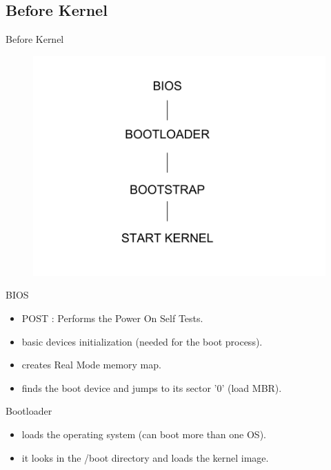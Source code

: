 \documentclass{workshop}
\begin{document}
\subsection{Before Kernel}
\begin{frame}{Before Kernel}
      \begin{figure}
         \includegraphics[scale=0.3]{img/boot.png}
      \end{figure}
\end{frame}

\begin{frame}{BIOS}
\begin{itemize}
\item POST : Performs the Power On Self Tests.
\item basic devices initialization (needed for the boot process).
\item creates Real Mode memory map.
\item finds the boot device and jumps to its sector '0' (load MBR).
\end{itemize}
\end{frame}

\begin{frame}{Bootloader}
\begin{itemize}
\item loads the operating system (can boot more than one OS).
\item it looks in the /boot directory and loads the kernel image.
\end{itemize}
\end{frame}
\end{document}
